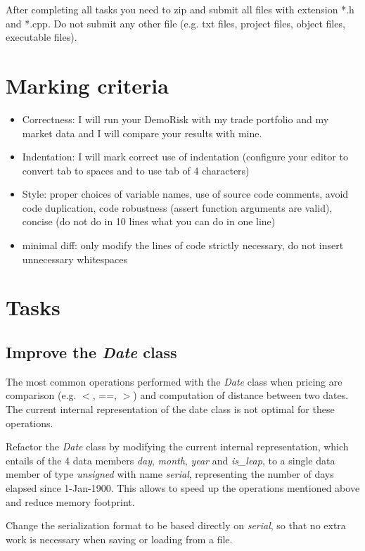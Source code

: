 \documentclass[10pt]{article}
\begin{document}
After completing all tasks you need to zip and submit all files with extension *.h and *.cpp. Do not submit any other file (e.g. txt files, project files, object files, executable files).

\section{Marking criteria}
\begin{itemize}
\item Correctness: I will run your DemoRisk with my trade portfolio and my market data and I will compare your results with mine.
\item Indentation: I will mark correct use of indentation (configure your editor to convert tab to spaces and to use tab of 4 characters)
\item Style: proper choices of variable names, use of source code comments, avoid code duplication, code robustness (assert function arguments are valid), concise (do not do in 10 lines what you can do in one line)
\item minimal diff: only modify the lines of code strictly necessary, do not insert unnecessary whitespaces
\end{itemize}

\section{Tasks}
\label{sec:task}

\subsection{Improve the \textit{Date} class}
The most common operations performed with the \textit{Date} class when pricing are comparison (e.g. $<$, ==, $>$) and computation of distance between two dates. The current internal representation of the date class is not optimal for these operations.

Refactor the \textit{Date} class by modifying the current internal representation, which entails of the 4 data members \textit{day}, \textit{month}, \textit{year} and \textit{is\_leap}, to a single data member of type \textit{unsigned} with name \textit{serial}, representing the number of days elapsed since 1-Jan-1900. This allows to speed up the operations mentioned above and reduce memory footprint.

Change the serialization format to be based directly on \textit{serial}, so that no extra work is necessary when saving or loading from a file.
\end{document}

